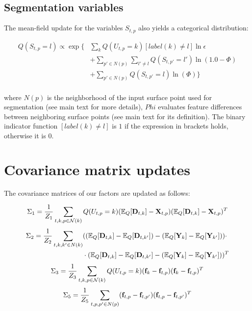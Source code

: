\subsection{Segmentation variables}

The mean-field update for the variables $S_{t,p}$ also yields a categorical distribution:

\begin{align*}
Q(S_{t,p} = l) \propto \exp\bigg\{ & \sum\limits_k Q(U_{t,p} = k) [label(k) \ne l] \ln\epsilon \\
& + \sum\limits_{p' \in N(p)} \sum\limits_{l' \ne l} Q(S_{t,p'} = l' ) \ln( 1.0 - \Phi ) \\
& + \sum\limits_{p' \in N(p)} Q(S_{t,p'} = l ) \ln( \Phi ) \bigg\} \\
\end{align*}

where $N(p)$ is the neighborhood of the input surface point used for segmentation (see main text for more details), $Phi$ evaluates feature differences between neighboring surface points (see main text for its definition). The binary indicator function $[label(k) \ne l]$ is $1$ if the expression in brackets holds, otherwise it is $0$. 

\section{Covariance matrix updates}

The covariance matrices of our factors are updated as follows: 

\begin{align*}
\Sigma_1 & = \frac{1}{Z_1} \sum\limits_{t,k,p \in \mathcal{N}(k)} Q(U_{t,p} = k) (\mathbb{E}_Q[\mathbf{D}_{t,k}] - \mathbf{X}_{t,p}) (\mathbb{E}_Q[\mathbf{D}_{t,k}] - \mathbf{X}_{t,p})^T \\
\end{align*}
\begin{align*}
\Sigma_2 = \frac{1}{Z_2} \sum\limits_{t,k,k' \in N(k)} & ( (\mathbb{E}_Q[\mathbf{D}_{t,k}] - \mathbb{E}_Q[\mathbf{D}_{t,k'}]) - (\mathbb{E}_Q[\mathbf{Y}_k] - \mathbb{E}_Q[\mathbf{Y}_{k'}]) ) \cdot \\
& \cdot (\mathbb{E}_Q[\mathbf{D}_{t,k}] - \mathbb{E}_Q[\mathbf{D}_{t,k'}] - (\mathbb{E}_Q[\mathbf{Y}_k] - \mathbb{E}_Q[\mathbf{Y}_{k'}]) )^T
\end{align*}
\begin{align*}
\Sigma_3 = \frac{1}{Z_3}\sum\limits_{t,k,p \in \mathcal{N}(k)}  Q(U_{t,p} = k) (\mathbf{f}_k - \mathbf{f}_{t,p}) (\mathbf{f}_k - \mathbf{f}_{t,p})^T 
\end{align*}
\begin{align*}
\Sigma_5 = \frac{1}{Z_5} \sum\limits_{t,p,p' \in N(p)} ( \mathbf{f}_{t,p} - \mathbf{f}_{t,p'}) ( \mathbf{f}_{t,p} - \mathbf{f}_{t,p'})^T \\
\end{align*}

